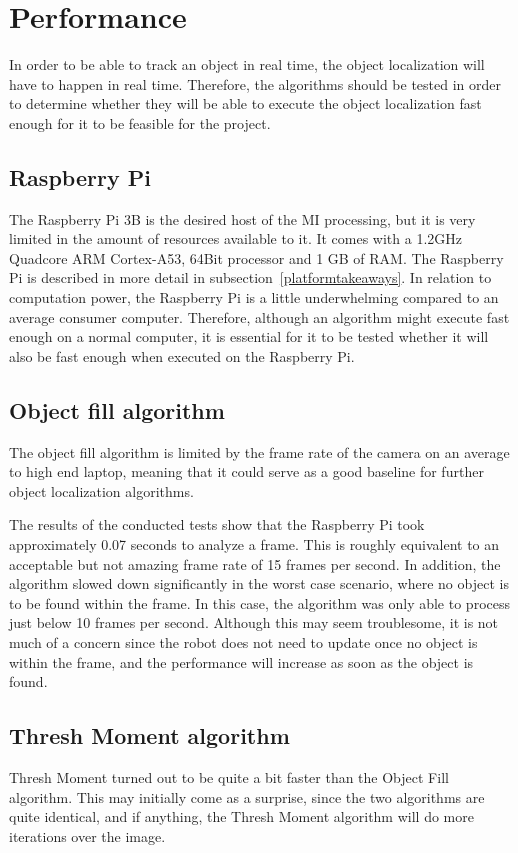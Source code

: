 \section{Performance}\label{sec:performance}
In order to be able to track an object in real time, the object localization will have to happen in real time.
Therefore, the algorithms should be tested in order to determine whether they will be able to execute the object localization fast enough for it to be feasible for the project.

\subsection{Raspberry Pi}
The Raspberry Pi 3B is the desired host of the MI processing, but it is very limited in the amount of resources available to it.
It comes with a 1.2GHz Quadcore ARM Cortex-A53, 64Bit processor and 1 GB of RAM.
The Raspberry Pi is described in more detail in subsection~\ref{platformtakeaways}.
In relation to computation power, the Raspberry Pi is a little underwhelming compared to an average consumer computer.
Therefore, although an algorithm might execute fast enough on a normal computer, it is essential for it to be tested whether it will also be fast enough when executed on the Raspberry Pi.

\subsection{Object fill algorithm}
The object fill algorithm is limited by the frame rate of the camera on an average to high end laptop, meaning that it could serve as a good baseline for further object localization algorithms.

The results of the conducted tests show that the Raspberry Pi took approximately 0.07 seconds to analyze a frame.
This is roughly equivalent to an acceptable but not amazing frame rate of 15 frames per second.
In addition, the algorithm slowed down significantly in the worst case scenario, where no object is to be found within the frame.
In this case, the algorithm was only able to process just below 10 frames per second.
Although this may seem troublesome, it is not much of a concern since the robot does not need to update once no object is within the frame, and the performance will increase as soon as the object is found.

\subsection{Thresh Moment algorithm}
Thresh Moment turned out to be quite a bit faster than the Object Fill algorithm.
This may initially come as a surprise, since the two algorithms are quite identical, and if anything, the Thresh Moment algorithm will do more iterations over the image.

